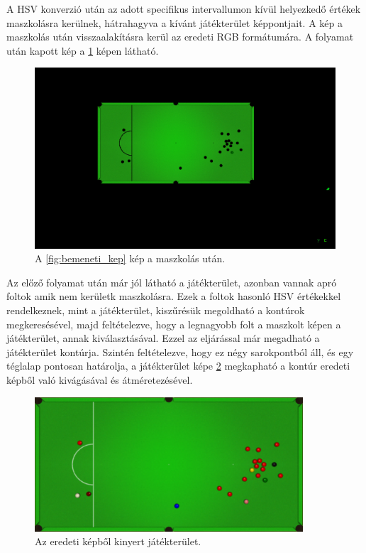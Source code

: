 \par A HSV konverzió után az adott specifikus intervallumon kívül helyezkedő értékek maszkolásra kerülnek, hátrahagyva a kívánt játékterület képpontjait. A kép a maszkolás után visszaalakításra kerül az eredeti RGB formátumára. A folyamat után kapott kép a \ref{fig:bemeneti_kep_mask} képen látható.

\begin{figure}[!ht]
    \centering
    \includegraphics[width=150mm, keepaspectratio]{figures/input_screen_mask.png}
    \caption{A \ref{fig:bemeneti_kep} kép a maszkolás után.}
    \label{fig:bemeneti_kep_mask}
\end{figure}

\par Az előző folyamat után már jól látható a játékterület, azonban vannak apró foltok amik nem kerületk maszkolásra. Ezek a foltok hasonló HSV értékekkel rendelkeznek, mint a játékterület, kiszűrésük megoldható a kontúrok megkeresésével, majd feltételezve, hogy a legnagyobb folt a maszkolt képen a játékterület, annak kiválasztásával. Ezzel az eljárással már megadható a játékterület kontúrja. Szintén feltételezve, hogy ez négy sarokpontból áll, és egy téglalap pontosan határolja, a játékterület képe \ref{fig:bemeneti_asztal2} megkapható a kontúr eredeti képből való kivágásával és átméretezésével.

\begin{figure}[!ht]
    \centering
    \includegraphics[width=100mm, keepaspectratio]{figures/input_table2.png}
    \caption{Az eredeti képből kinyert játékterület.}
    \label{fig:bemeneti_asztal2}
\end{figure}

